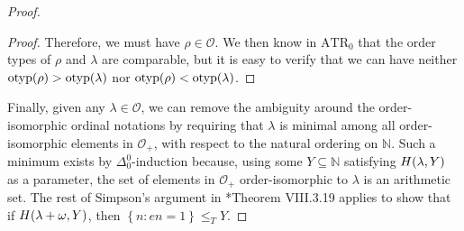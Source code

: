 \documentclass[12pt,openany]{book}
\theoremstyle{plain}
\theoremstyle{definition}
\DeclareMathOperator\otyp{otyp}
\newcommand\ATR{\mathrm{ATR}}
\begin{document}
\begin{proof}
\begin{proof}
    Therefore, we must have $\rho \in \mathcal{O}$. We then know in $\ATR_0$ that the order types of $\rho$ and $\lambda$ are comparable, but it is easy to verify that we can have neither $\otyp\mleft(\rho\mright) > \otyp\mleft(\lambda\mright)$ nor $\otyp\mleft(\rho\mright) < \otyp\mleft(\lambda\mright)$.
  \end{proof}

  Finally, given any $\lambda \in \mathcal{O}$, we can remove the ambiguity around the order-isomorphic ordinal notations by requiring that $\lambda$ is minimal among all order-isomorphic elements in $\mathcal{O}_+$, with respect to the natural ordering on $\mathbb{N}$. Such a minimum exists by $\Delta^0_0$-induction because, using some $Y \subseteq \mathbb{N}$ satisfying $H\mleft(\lambda, Y\mright)$ as a parameter, the set of elements in $\mathcal{O}_+$ order-isomorphic to $\lambda$ is an arithmetic set. The rest of Simpson's argument in \cite{simpson09-soa}*{Theorem VIII.3.19} applies to show that if $H\mleft(\lambda + \omega, Y\mright)$, then $\left\{n : en = 1\right\} \leq_T Y$.


\end{proof}
\end{document}
